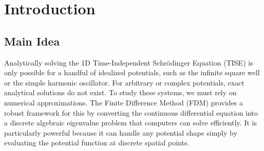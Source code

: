 \documentclass[12pt, a4paper, twoside]{article}
\begin{document}
    \begin{abstract}
        This report presents a comprehensive numerical investigation of the 1D Time-Independent Schrödinger Equation (TISE) utilizing the Finite Difference Method (FDM). The continuous differential equation was discretized into a symmetric tridiagonal matrix eigenvalue problem and solved efficiently using the TQLI (Tridiagonal QL Implicit) algorithm implemented in Fortran. A diverse suite of fourteen distinct quantum potentials was analyzed, ranging from foundational models—such as the infinite square well and harmonic oscillator—to complex anharmonic, asymmetric, and coupled-well systems. Furthermore, the computational methodology was extended to advanced physical applications, successfully modeling molecular dissociation via the Morse potential and singular boundary behavior via the Dirac-delta potential. Data visualization, handled systematically in Python, shifted the computed wavefunctions by their respective discrete eigen-energies. This approach provided clear visual confirmations of core quantum mechanical phenomena, including parity alternation, quantum penetration into classically forbidden regions, tunneling-induced spontaneous symmetry breaking, and the strict numerical distinction between bound and scattering states.
    \end{abstract}
    
    \thispagestyle{empty}
    \newpage

  	\tableofcontents
	\thispagestyle{empty}
	
	\clearpage

    \section{Introduction}

        \subsection{Main Idea}
        Analytically solving the 1D Time-Independent Schrödinger Equation (TISE) is only possible for a handful of idealized potentials, such as the infinite square well or the simple harmonic oscillator. For arbitrary or complex potentials, exact analytical solutions do not exist. To study these systems, we must rely on numerical approximations. The Finite Difference Method (FDM) provides a robust framework for this by converting the continuous differential equation into a discrete algebraic eigenvalue problem that computers can solve efficiently. It is particularly powerful because it can handle any potential shape simply by evaluating the potential function at discrete spatial points.
\end{document}
